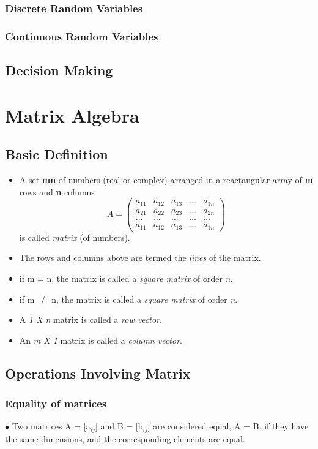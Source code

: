\documentclass[13pt]{book}
\begin{document}
\subsection{Discrete Random Variables}
\subsection{Continuous Random Variables}
\section{Decision Making}
\chapter{Matrix Algebra}
\section{Basic Definition}
\begin{itemize}
\item A set \textbf{mn} of numbers (real or complex) arranged in a reactangular array of \textbf{m} rows and \textbf{n} columns
  \[A =
  \begin{pmatrix}
    a_{11} & a_{12} & a_{13} & \dots & a_{1n}\\
    a_{21} & a_{22} & a_{23} & \dots & a_{2n} \\
    \dots & \dots & \dots & \dots  & \dots \\
    a_{11} & a_{12} & a_{13} & \dots & a_{1n}
  \end{pmatrix}
\]
is called \textit{matrix} (of numbers).
\item The rows and columns above are termed the \textit{lines} of the matrix.
\item if m = n, the matrix is called a \textit{square matrix} of order \textit{n}.
\item if m \(\neq\) n, the matrix is called a \textit{square matrix} of order \textit{n}.
\item A \textit{1 X n} matrix is called a \textit{row vector}.
\item An \textit{m X 1} matrix is called a \textit{column vector}.
\end{itemize}
\newcommand{\sectionbreak}{\clearpage}
\section{Operations Involving Matrix}
\subsection{Equality of matrices}
\(\bullet\) Two matrices A = [a\(_{ij}\)] and B = [b\(_{ij}\)] are considered equal, A = B, if they have the same dimensions, and the corresponding elements are equal.
\end{document}
